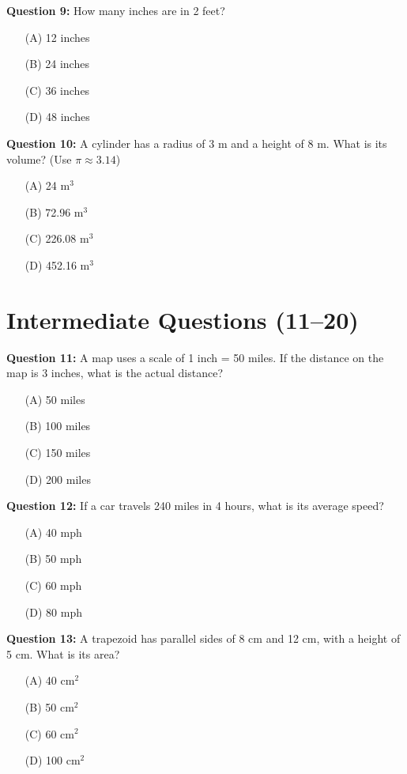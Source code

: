 \documentclass[12pt, letterpaper]{article}
\begin{document}
\noindent
\textbf{Question 9:} How many inches are in 2 feet?
\begin{itemize}
    \item[(A)] 12 inches
    \item[(B)] 24 inches
    \item[(C)] 36 inches
    \item[(D)] 48 inches
\end{itemize}

\noindent
\textbf{Question 10:} A cylinder has a radius of 3 m and a height of 8 m. What is its volume? (Use $\pi \approx 3.14$)
\begin{itemize}
    \item[(A)] 24 m$^3$
    \item[(B)] 72.96 m$^3$
    \item[(C)] 226.08 m$^3$
    \item[(D)] 452.16 m$^3$
\end{itemize}

\vspace{0.5cm}

\section*{Intermediate Questions (11--20)}

\noindent
\textbf{Question 11:} A map uses a scale of 1 inch = 50 miles. If the distance on the map is 3 inches, what is the actual distance?
\begin{itemize}
    \item[(A)] 50 miles
    \item[(B)] 100 miles
    \item[(C)] 150 miles
    \item[(D)] 200 miles
\end{itemize}

\noindent
\textbf{Question 12:} If a car travels 240 miles in 4 hours, what is its average speed?
\begin{itemize}
    \item[(A)] 40 mph
    \item[(B)] 50 mph
    \item[(C)] 60 mph
    \item[(D)] 80 mph
\end{itemize}

\noindent
\textbf{Question 13:} A trapezoid has parallel sides of 8 cm and 12 cm, with a height of 5 cm. What is its area?
\begin{itemize}
    \item[(A)] 40 cm$^2$
    \item[(B)] 50 cm$^2$
    \item[(C)] 60 cm$^2$
    \item[(D)] 100 cm$^2$
\end{itemize}
\end{document}
